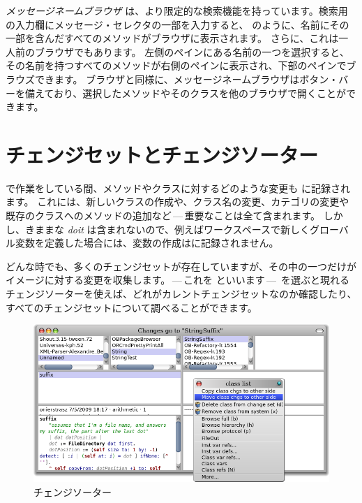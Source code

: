 \documentclass[a4paper,10pt,twoside]{book}
\begin{document}
\emph{メッセージネームブラウザ} は、より限定的な検索機能を持っています。検索用の入力欄にメッセージ・セレクタの一部を入力すると、 のように、名前にその一部を含んだすべてのメソッドがブラウザに表示されます。
さらに、これは一人前のブラウザでもあります。
左側のペインにある名前の一つを選択すると、その名前を持つすべてのメソッドが右側のペインに表示され、下部のペインでブラウズできます。
ブラウザと同様に、メッセージネームブラウザはボタン・バーを備えており、選択したメソッドやそのクラスを他のブラウザで開くことができます。



\section{チェンジセットとチェンジソーター}

\pharo で作業をしている間、メソッドやクラスに対するどのような変更も  に記録されます。
これには、新しいクラスの作成や、クラス名の変更、カテゴリの変更や既存のクラスへのメソッドの追加など\,---\,重要なことは全て含まれます。
しかし、きままな \emph{doit} は含まれないので、例えばワークスペースで新しくグローバル変数を定義した場合には、変数の作成はに記録されません。

どんな時でも、多くのチェンジセットが存在していますが、その中の一つだけがイメージに対する変更を収集します。\,---\,これを  といいます\,---\,
を選ぶと現れるチェンジソーターを使えば、どれがカレントチェンジセットなのか確認したり、すべてのチェンジセットについて調べることができます。

\begin{figure}[btp]
\begin{center}
\includegraphics[width=\linewidth]{changeSorter}
\end{center}
\caption{チェンジソーター}
\end{figure}
\end{document}
